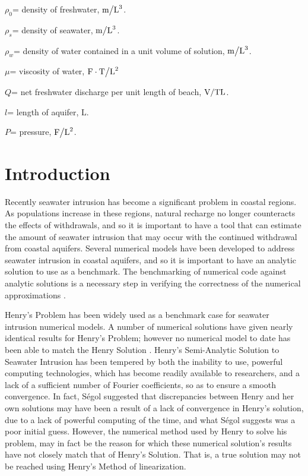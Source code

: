 \documentclass{article}
\begin{document}
$\rho _{0} $= density of freshwater, ${ \text{m} \mathord{\left/ {\vphantom {{\rm
m} \text{L} ^{3} }} \right. \kern-\nulldelimiterspace} \text{L} ^{3} }
$.

$\rho _{s} $= density of seawater, ${ \text{m} \mathord{\left/ {\vphantom { \text{m} 
 \text{L} ^{3} }} \right. \kern-\nulldelimiterspace} \text{L} ^{3} } $.

$\rho _{w} $= density of water contained in a unit volume of solution, ${{\rm
m} \mathord{\left/ {\vphantom { \text{m L} ^{3} }} \right.
\kern-\nulldelimiterspace} \text{L} ^{3} } $.

$\mu $= viscosity of water, $ \text{F} \cdot { \text{T} \mathord{\left/ {\vphantom
{ \text{T L} ^{2} }} \right. \kern-\nulldelimiterspace} \text{L} ^{{\rm
2}} } $

$Q$= net freshwater discharge per unit length of beach, ${ \text{V} \mathord{\left/
{\vphantom { \text{V TL} }} \right. \kern - \nulldelimiterspace} \text{TL} } $.

$l$= length of aquifer, $ \text{L} $.

$P$= pressure, ${ \text{F} \mathord{\left/ {\vphantom { \text{F L} ^{2} }}
\right. \kern-\nulldelimiterspace} \text{L} ^{2} } $.

\section{Introduction}
Recently seawater intrusion has become a significant problem in coastal regions.
As populations increase in these regions, natural recharge no longer counteracts
the effects of withdrawals, and so it is important to have a tool that can
estimate the amount of seawater intrusion that may occur with the continued
withdrawal from coastal aquifers. Several numerical models have been developed
to address seawater intrusion in coastal aquifers, and so it is important to
have an analytic solution to use as a benchmark. The benchmarking of numerical
code against analytic solutions is a necessary step in verifying the correctness
of the numerical approximations \cite{Simpson}.

Henry's Problem has been widely used as a benchmark case for seawater intrusion
numerical models. A number of numerical solutions have given nearly identical
results for Henry's Problem; however no numerical model to date has been able to
match the Henry Solution \cite{Voss}. Henry's Semi-Analytic Solution to Seawater
Intrusion has been tempered by both the inability to use, powerful computing
technologies, which has become readily available to researchers, and a lack of a
sufficient number of Fourier coefficients, so as to ensure a smooth convergence.
In fact, S\'egol \cite{Segol} suggested that discrepancies between Henry and her
own solutions may have been a result of a lack of convergence in Henry's
solution, due to a lack of powerful computing of the time, and what S\'egol
suggests was a poor initial guess. However, the numerical method used by Henry
to solve his problem, may in fact be the reason for which these numerical
solution's results have not closely match that of Henry's Solution. That is, a
true solution may not be reached using Henry's Method of linearization.
\end{document}
